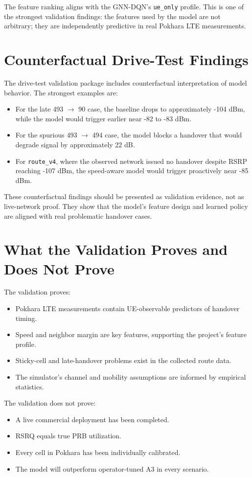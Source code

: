 \documentclass[12pt,a4paper]{report}
\newcommand{\ueonly}{\texttt{ue\_only}}
\begin{document}
The feature ranking aligns with the GNN-DQN's \ueonly{} profile. This is one of the strongest validation findings: the features used by the model are not arbitrary; they are independently predictive in real Pokhara LTE measurements.

\section{Counterfactual Drive-Test Findings}
The drive-test validation package includes counterfactual interpretation of model behavior. The strongest examples are:

\begin{itemize}
    \item For the late 493 $\rightarrow$ 90 case, the baseline drops to approximately -104 dBm, while the model would trigger earlier near -82 to -83 dBm.
    \item For the spurious 493 $\rightarrow$ 494 case, the model blocks a handover that would degrade signal by approximately 22 dB.
    \item For \texttt{route\_v4}, where the observed network issued no handover despite RSRP reaching -107 dBm, the speed-aware model would trigger proactively near -85 dBm.
\end{itemize}

These counterfactual findings should be presented as validation evidence, not as live-network proof. They show that the model's feature design and learned policy are aligned with real problematic handover cases.

\section{What the Validation Proves and Does Not Prove}
The validation proves:
\begin{itemize}
    \item Pokhara LTE measurements contain UE-observable predictors of handover timing.
    \item Speed and neighbor margin are key features, supporting the project's feature profile.
    \item Sticky-cell and late-handover problems exist in the collected route data.
    \item The simulator's channel and mobility assumptions are informed by empirical statistics.
\end{itemize}

The validation does not prove:
\begin{itemize}
    \item A live commercial deployment has been completed.
    \item RSRQ equals true PRB utilization.
    \item Every cell in Pokhara has been individually calibrated.
    \item The model will outperform operator-tuned A3 in every scenario.
\end{itemize}
\end{document}
